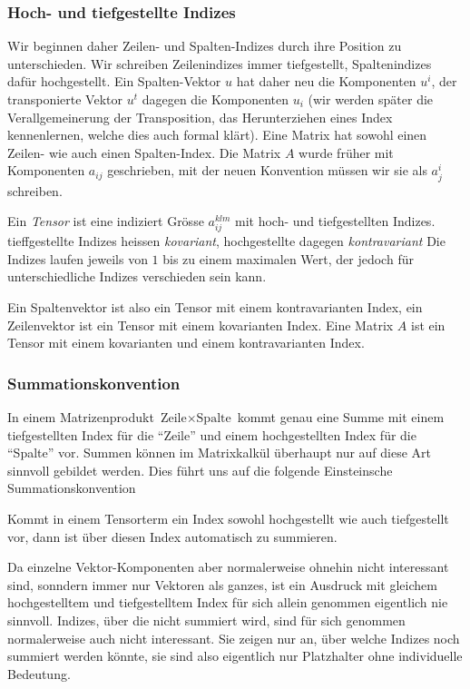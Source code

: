 \subsubsection{Hoch- und tiefgestellte Indizes}
Wir beginnen daher Zeilen- und Spalten-Indizes durch ihre Position zu
unterschieden.
Wir schreiben Zeilenindizes immer tiefgestellt, Spaltenindizes dafür
hochgestellt.
Ein Spalten-Vektor $u$ hat daher neu die Komponenten $u^i$, der
transponierte Vektor $u^t$ dagegen die Komponenten $u_i$ (wir werden
später die Verallgemeinerung der Transposition, das Herunterziehen eines
Index kennenlernen, welche dies auch formal klärt).
Eine Matrix hat sowohl einen Zeilen- wie auch einen Spalten-Index.
Die Matrix $A$ wurde früher mit Komponenten $a_{ij}$ geschrieben,
mit der neuen Konvention müssen wir sie als $a_j^i$ schreiben.

\begin{definition}
\label{tensor:definition1}
Ein {\em Tensor} ist eine indiziert Grösse
$a_{ij}^{klm}$
mit hoch- und tiefgestellten Indizes.
tieffgestellte Indizes heissen {\em kovariant}, hochgestellte dagegen
{\em kontravariant}
Die Indizes laufen jeweils von $1$ bis zu einem maximalen Wert, der jedoch
für unterschiedliche Indizes verschieden sein kann.
\end{definition}

Ein Spaltenvektor ist also ein Tensor mit einem kontravarianten Index,
ein Zeilenvektor ist ein Tensor mit einem kovarianten Index.
Eine Matrix $A$ ist ein Tensor mit einem kovarianten und einem kontravarianten
Index.

\subsubsection{Summationskonvention}
In einem Matrizenprodukt $\text{Zeile}\times\text{Spalte}$ kommt 
genau eine Summe mit einem tiefgestellten Index für die ``Zeile'' und
einem hochgestellten Index für die ``Spalte'' vor.
Summen können im Matrixkalkül überhaupt nur auf diese Art sinnvoll
gebildet werden.
Dies führt uns auf die folgende Einsteinsche Summationskonvention
\begin{definition}
\label{tensor:summationskonvention}
Kommt in einem Tensorterm ein Index sowohl hochgestellt wie auch tiefgestellt
vor, dann ist über diesen Index automatisch zu summieren.
\end{definition}

Da einzelne Vektor-Komponenten aber normalerweise ohnehin nicht interessant
sind, sonndern immer nur Vektoren als ganzes, ist ein Ausdruck mit gleichem
hochgestelltem und tiefgestelltem Index für sich allein genommen eigentlich
nie sinnvoll.
Indizes, über die nicht summiert wird, sind für sich genommen normalerweise
auch nicht interessant.
Sie zeigen nur an, über welche Indizes noch summiert werden könnte, sie
sind also eigentlich nur Platzhalter ohne individuelle Bedeutung.

